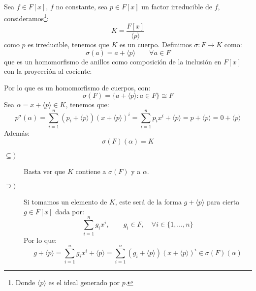 \begin{ejemplo}
    Sea $f\in F[x]$, $f$ no constante, sea $p\in F[x]$ un factor irreducible de $f$, consideramos\footnote{Donde $\langle p \rangle $ es el ideal generado por $p$.}:
    \begin{equation*}
        K = \dfrac{F[x]}{\langle p \rangle }
    \end{equation*}
    como $p$ es irreducible, tenemos que $K$ es un cuerpo. Definimos $\sigma:F\to K$ como:
    \begin{equation*}
        \sigma(a) = a + \langle p \rangle  \qquad \forall a\in F
    \end{equation*}
    que es un homomorfismo de anillos como composición de la inclusión en $F[x]$ con la proyección al cociente:
    \begin{figure}[H]
        \centering
    \end{figure}
    \noindent
    Por lo que es un homomorfismo de cuerpos, con:
    \begin{equation*}
        \sigma(F) = \{a+\langle p \rangle : a\in F\} \cong F
    \end{equation*}
    Sea $\alpha = x+\langle p \rangle \in K$, tenemos que:
    \begin{equation*}
        p^\sigma(\alpha) = \sum_{i=1}^{n} (p_i + \langle p \rangle){(x+\langle p \rangle )}^{i} = \sum_{i=1}^{n} p_ix^i + \langle p \rangle  = p + \langle p \rangle  = 0 + \langle p \rangle 
    \end{equation*}
    Además:
    \begin{equation*}
        \sigma(F)(\alpha) = K
    \end{equation*}
    \begin{description}
        \item [$\subseteq )$] Basta ver que $K$ contiene a $\sigma(F)$ y a $\alpha$.
        \item [$\supseteq )$] Si tomamos un elemento de $K$, este será de la forma $g+\langle p \rangle $ para cierta $g\in F[x]$ dada por:
            \begin{equation*}
                \sum_{i=1}^{n}g_ix^i, \qquad g_i \in F, \quad \forall i \in \{1,\ldots,n\}
            \end{equation*}
            Por lo que:
            \begin{equation*}
                g+\langle p \rangle  = \sum_{i=1}^{n}g_ix^i + \langle p \rangle  = \sum_{i=1}^{n}(g_i+\langle p \rangle ){(x+\langle p \rangle )}^{i} \in \sigma(F)(\alpha)
            \end{equation*}
    \end{description}
\end{ejemplo}

